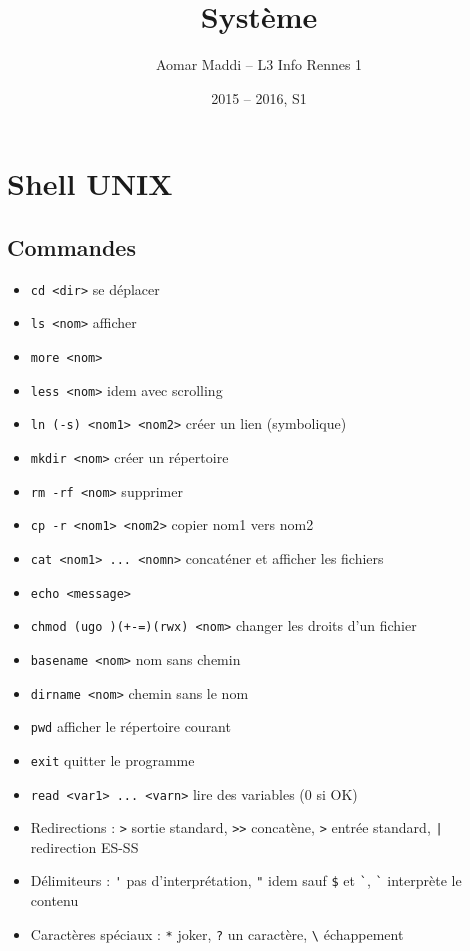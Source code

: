 \documentclass[a4paper]{article}
\title{Système}
\author{Aomar Maddi -- L3 Info Rennes 1}
\date{2015 -- 2016, S1}
\begin{document}
\maketitle

\section{Shell UNIX}

\subsection{Commandes}

\begin{itemize}
	\item \verb?cd <dir>? se déplacer
	\item \verb?ls <nom>? afficher
	\item \verb?more <nom>?
	\item \verb?less <nom>? idem avec scrolling
	\item \verb?ln (-s) <nom1> <nom2>? créer un lien (symbolique)
	\item \verb?mkdir <nom>? créer un répertoire
	\item \verb?rm -rf <nom>? supprimer
	\item \verb?cp -r <nom1> <nom2>? copier nom1 vers nom2
	\item \verb?cat <nom1> ... <nomn>? concaténer et afficher les fichiers
	\item \verb?echo <message>?
	\item \verb?chmod (ugo )(+-=)(rwx) <nom>? changer les droits d'un fichier
	\item \verb?basename <nom>? nom sans chemin
	\item \verb?dirname <nom>? chemin sans le nom
	\item \verb?pwd? afficher le répertoire courant
	\item \verb?exit? quitter le programme
	\item \verb?read <var1> ... <varn>? lire des variables (0 si OK) 
	\item Redirections : \verb?>? sortie standard, \verb?>>? concatène, \verb?>? entrée standard, \verb?|? redirection ES-SS
	\item Délimiteurs : \verb?'? pas d'interprétation, \verb?"? idem sauf \verb?$? et \verb?`?, \verb?`? interprète le contenu
	\item Caractères spéciaux : \verb?*? joker, \verb|?| un caractère, \verb?\? échappement
\end{itemize}
\end{document}
